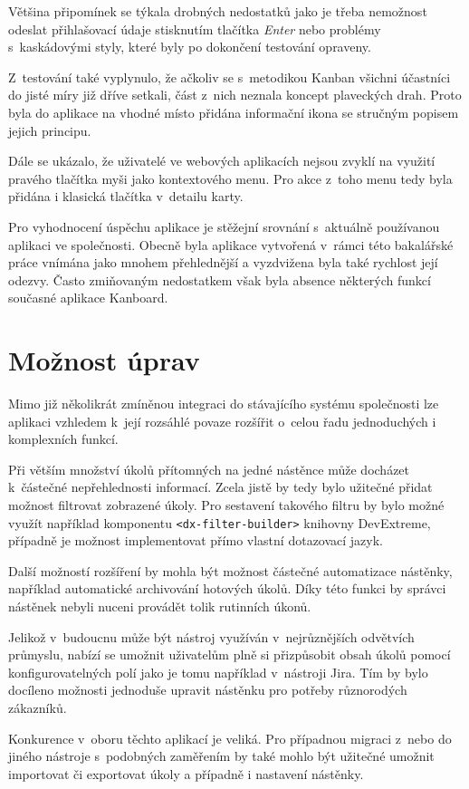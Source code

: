 Většina připomínek se týkala drobných nedostatků jako je třeba nemožnost odeslat přihlašovací údaje stisknutím tlačítka \emph{Enter} nebo problémy s~kaskádovými styly, které byly po dokončení testování opraveny.

Z~testování také vyplynulo, že ačkoliv se s~metodikou Kanban všichni účastníci do jisté míry již dříve setkali, část z~nich neznala koncept plaveckých drah. Proto byla do aplikace na vhodné místo přidána informační ikona se stručným popisem jejich principu.

Dále se ukázalo, že uživatelé ve webových aplikacích nejsou zvyklí na využití pravého tlačítka myši jako kontextového menu. Pro akce z~toho menu tedy byla přidána i klasická tlačítka v~detailu karty. 

Pro vyhodnocení úspěchu aplikace je stěžejní srovnání s~aktuálně používanou aplikaci ve společnosti. Obecně byla aplikace vytvořená v~rámci této bakalářské práce vnímána jako mnohem přehlednější a vyzdvižena byla také rychlost její odezvy. Často zmiňovaným nedostatkem však byla absence některých funkcí současné aplikace Kanboard.

\section{Možnost úprav}
Mimo již několikrát zmíněnou integraci do stávajícího systému společnosti lze aplikaci vzhledem k~její rozsáhlé povaze rozšířit o~celou řadu jednoduchých i komplexních funkcí.

Při větším množství úkolů přítomných na jedné nástěnce může docházet k~částečné nepřehlednosti informací. Zcela jistě by tedy bylo užitečné přidat možnost filtrovat zobrazené úkoly. Pro sestavení takového filtru by bylo možné využít například komponentu \texttt{<dx-filter-builder>} knihovny DevExtreme, případně je možnost implementovat přímo vlastní dotazovací jazyk.

Další možností rozšíření by mohla být možnost částečné automatizace nástěnky, například automatické archivování hotových úkolů. Díky této funkci by správci nástěnek nebyli nuceni provádět tolik rutinních úkonů. 

Jelikož v~budoucnu může být nástroj využíván v~nejrůznějších odvětvích průmyslu, nabízí se umožnit uživatelům plně si přizpůsobit obsah úkolů pomocí konfigurovatelných polí jako je tomu například v~nástroji Jira. Tím by bylo docíleno možnosti jednoduše upravit nástěnku pro potřeby různorodých zákazníků.

Konkurence v~oboru těchto aplikací je veliká. Pro případnou migraci z~nebo do jiného nástroje s~podobných zaměřením by také mohlo být užitečné umožnit importovat či exportovat úkoly a případně i nastavení nástěnky.




